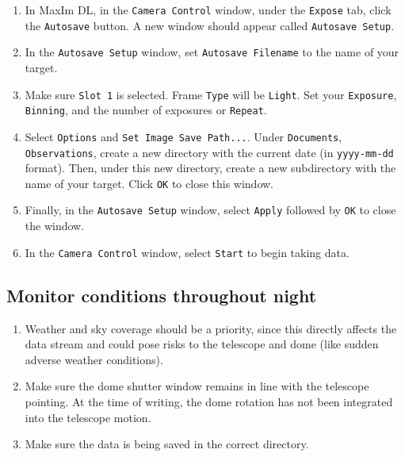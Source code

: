 \documentclass{article}
\begin{document}
		\begin{enumerate}
			
			\item In MaxIm DL, in the \texttt{Camera Control} window, under the \texttt{Expose} tab, click the \texttt{Autosave} button. A new window should appear called \texttt{Autosave Setup}.
			
			\item In the \texttt{Autosave Setup} window, set \texttt{Autosave Filename} to the name of your target.
			
			\item Make sure \texttt{Slot 1} is selected. Frame \texttt{Type} will be \texttt{Light}. Set your \texttt{Exposure}, \texttt{Binning}, and the number of exposures or \texttt{Repeat}.
			
			\item Select \texttt{Options} and \texttt{Set Image Save Path...}. Under \texttt{Documents}, \texttt{Observations}, create a new directory with the current date (in \texttt{yyyy-mm-dd} format). Then, under this new directory, create a new subdirectory with the name of your target. Click \texttt{OK} to close this window.
			
			\item Finally, in the \texttt{Autosave Setup} window, select \texttt{Apply} followed by \texttt{OK} to close the window.
			
			\item In the \texttt{Camera Control} window, select \texttt{Start} to begin taking data.
			
		\end{enumerate}
		
	\subsection{Monitor conditions throughout night}
		
		\begin{enumerate}
			
			\item Weather and sky coverage should be a priority, since this directly affects the data stream and could pose risks to the telescope and dome (like sudden adverse weather conditions).
			
			\item Make sure the dome shutter window remains in line with the telescope pointing. At the time of writing, the dome rotation has not been integrated into the telescope motion.
			
			\item Make sure the data is being saved in the correct directory.
			
		\end{enumerate}
		
\end{document}
